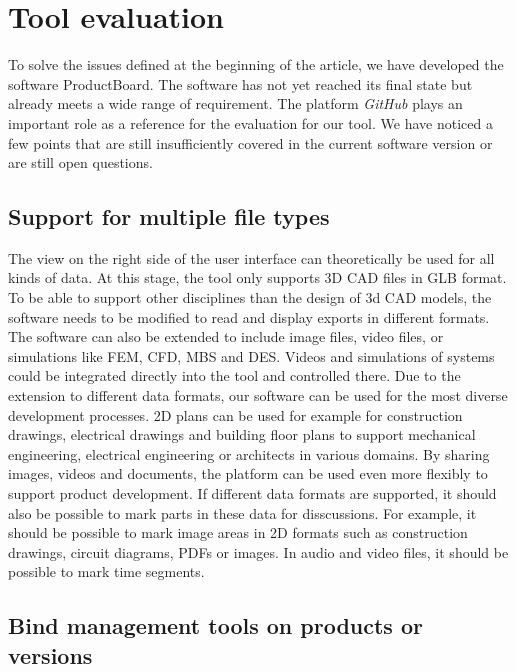 \section{Tool evaluation}
\label{sec:evaluation}

To solve the issues defined at the beginning of the article, we have developed the software ProductBoard. The software has not yet reached its final state but already meets a wide range of requirement. The platform \textit{GitHub} plays an important role as a reference for the evaluation for our tool.
We have noticed a few points that are still insufficiently covered in the current software version or are still open questions.

\subsection*{Support for multiple file types}

The view on the right side of the user interface can theoretically be used for all kinds of data.
At this stage, the tool only supports 3D CAD files in GLB format. To be able to support other disciplines than the design of 3d CAD models, the software needs to be modified to read and display exports in different formats. The software can also be extended to include image files, video files, or simulations like FEM, CFD, MBS and DES. Videos and simulations of systems could be integrated directly into the tool and controlled there.
Due to the extension to different data formats, our software can be used for the most diverse development processes. 
2D plans can be used for example for construction drawings, electrical drawings and building floor plans to support mechanical engineering, electrical engineering or architects in various domains.
By sharing images, videos and documents, the platform can be used even more flexibly to support product development.
If different data formats are supported, it should also be possible to mark parts in these data for disscussions.
For example, it should be possible to mark image areas in 2D formats such as construction drawings, circuit diagrams, PDFs or images. 
In audio and video files, it should be possible to mark time segments.

\subsection*{Bind management tools on products or versions}

